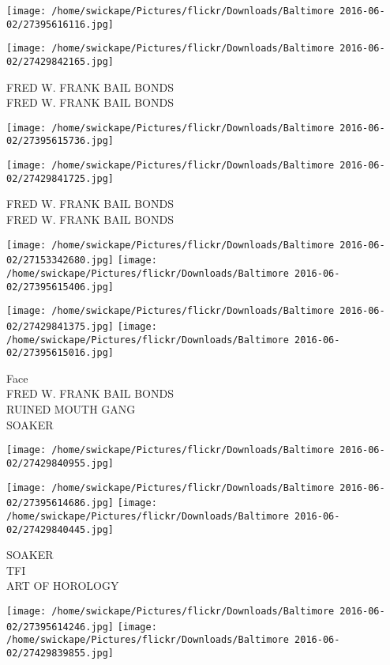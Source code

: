 \documentclass[10pt,letterpaper]{article}
\begin{document}
\texttt{[image: /home/swickape/Pictures/flickr/Downloads/Baltimore 2016-06-02/27395616116.jpg]}

\vspace{0.25in}
\texttt{[image: /home/swickape/Pictures/flickr/Downloads/Baltimore 2016-06-02/27429842165.jpg]}

FRED W. FRANK BAIL BONDS\\
FRED W. FRANK BAIL BONDS\\
\pagebreak

\texttt{[image: /home/swickape/Pictures/flickr/Downloads/Baltimore 2016-06-02/27395615736.jpg]}

\vspace{0.25in}
\texttt{[image: /home/swickape/Pictures/flickr/Downloads/Baltimore 2016-06-02/27429841725.jpg]}

FRED W. FRANK BAIL BONDS\\
FRED W. FRANK BAIL BONDS\\
\pagebreak

\texttt{[image: /home/swickape/Pictures/flickr/Downloads/Baltimore 2016-06-02/27153342680.jpg]}
\texttt{[image: /home/swickape/Pictures/flickr/Downloads/Baltimore 2016-06-02/27395615406.jpg]}

\texttt{[image: /home/swickape/Pictures/flickr/Downloads/Baltimore 2016-06-02/27429841375.jpg]}
\texttt{[image: /home/swickape/Pictures/flickr/Downloads/Baltimore 2016-06-02/27395615016.jpg]}

Face\\
FRED W. FRANK BAIL BONDS\\
RUINED MOUTH GANG\\
SOAKER\\
\pagebreak

\texttt{[image: /home/swickape/Pictures/flickr/Downloads/Baltimore 2016-06-02/27429840955.jpg]}

\vspace{0.25in}
\texttt{[image: /home/swickape/Pictures/flickr/Downloads/Baltimore 2016-06-02/27395614686.jpg]}
\texttt{[image: /home/swickape/Pictures/flickr/Downloads/Baltimore 2016-06-02/27429840445.jpg]}

SOAKER\\
TFI\\
ART OF HOROLOGY\\
\pagebreak

\texttt{[image: /home/swickape/Pictures/flickr/Downloads/Baltimore 2016-06-02/27395614246.jpg]}
\texttt{[image: /home/swickape/Pictures/flickr/Downloads/Baltimore 2016-06-02/27429839855.jpg]}
\end{document}
